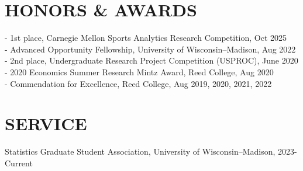 \documentclass[margin]{res}
\begin{document}
\begin{resume}
\section{HONORS \& AWARDS} 
- 1st place, Carnegie Mellon Sports Analytics Research Competition, Oct 2025 \\
- Advanced Opportunity Fellowship, University of Wisconsin--Madison, Aug 2022 \\
- 2nd place, Undergraduate Research Project Competition (USPROC), June 2020 \\ 
- 2020 Economics Summer Research Mintz Award, Reed College, Aug 2020 \\
- Commendation for Excellence, Reed College, Aug 2019, 2020, 2021, 2022
\vspace*{-1em}

\section{SERVICE} 
Statistics Graduate Student Association, University of Wisconsin--Madison, 2023-Current

\end{resume} 
\end{document}
